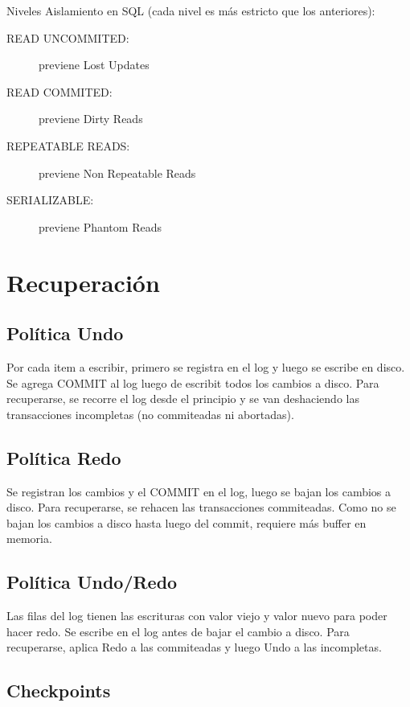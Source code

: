 Niveles Aislamiento en SQL (cada nivel es más estricto que los anteriores):

\begin{description}
	\item[READ UNCOMMITED:] previene Lost Updates
	\item[READ COMMITED:] previene Dirty Reads
	\item[REPEATABLE READS:] previene Non Repeatable Reads
	\item[SERIALIZABLE:] previene Phantom Reads
\end{description}

\section{Recuperación}

\subsection{Política Undo}

Por cada item a escribir, primero se registra en el log y luego se escribe en disco.
Se agrega COMMIT al log luego de escribit todos los cambios a disco.
Para recuperarse, se recorre el log desde el principio y se van deshaciendo las transacciones incompletas (no commiteadas ni abortadas).

\subsection{Política Redo}

Se registran los cambios y el COMMIT en el log, luego se bajan los cambios a disco.
Para recuperarse, se rehacen las transacciones commiteadas.
Como no se bajan los cambios a disco hasta luego del commit, requiere más buffer en memoria.

\subsection{Política Undo/Redo}

Las filas del log tienen las escrituras con valor viejo y valor nuevo para poder hacer redo.
Se escribe en el log antes de bajar el cambio a disco.
Para recuperarse, aplica Redo a las commiteadas y luego Undo a las incompletas.

\subsection{Checkpoints}

